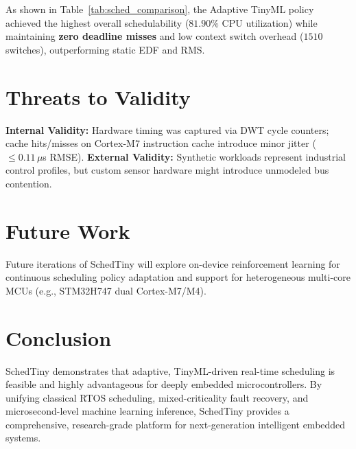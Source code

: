 \documentclass[conference]{IEEEtran}
\begin{document}


As shown in Table~\ref{tab:sched_comparison}, the Adaptive TinyML policy achieved the highest overall schedulability ($81.90\%$ CPU utilization) while maintaining \textbf{zero deadline misses} and low context switch overhead ($1510$ switches), outperforming static EDF and RMS.

\section{Threats to Validity}
\textbf{Internal Validity:} Hardware timing was captured via DWT cycle counters; cache hits/misses on Cortex-M7 instruction cache introduce minor jitter ($\le 0.11\,\mu$s RMSE).
\textbf{External Validity:} Synthetic workloads represent industrial control profiles, but custom sensor hardware might introduce unmodeled bus contention.

\section{Future Work}
Future iterations of SchedTiny will explore on-device reinforcement learning for continuous scheduling policy adaptation and support for heterogeneous multi-core MCUs (e.g., STM32H747 dual Cortex-M7/M4).

\section{Conclusion}
SchedTiny demonstrates that adaptive, TinyML-driven real-time scheduling is feasible and highly advantageous for deeply embedded microcontrollers. By unifying classical RTOS scheduling, mixed-criticality fault recovery, and microsecond-level machine learning inference, SchedTiny provides a comprehensive, research-grade platform for next-generation intelligent embedded systems.



\end{document}

